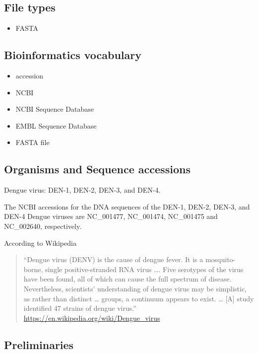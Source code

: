 \documentclass[
]{book}
\providecommand{\tightlist}{%
  \setlength{\itemsep}{0pt}\setlength{\parskip}{0pt}}
\begin{document}
\hypertarget{file-types}{%
\subsection{File types}\label{file-types}}

\begin{itemize}
\tightlist
\item
  FASTA
\end{itemize}

\hypertarget{bioinformatics-vocabulary}{%
\subsection{Bioinformatics vocabulary}\label{bioinformatics-vocabulary}}

\begin{itemize}
\tightlist
\item
  accession
\item
  NCBI
\item
  NCBI Sequence Database
\item
  EMBL Sequence Database
\item
  FASTA file
\end{itemize}

\hypertarget{organisms-and-sequence-accessions}{%
\subsection{Organisms and Sequence accessions}\label{organisms-and-sequence-accessions}}

Dengue virus: DEN-1, DEN-2, DEN-3, and DEN-4.

The NCBI accessions for the DNA sequences of the DEN-1, DEN-2, DEN-3, and DEN-4 Dengue viruses are NC\_001477, NC\_001474, NC\_001475 and NC\_002640, respectively.

According to Wikipedia

\begin{quote}
``Dengue virus (DENV) is the cause of dengue fever. It is a mosquito-borne, single positive-stranded RNA virus \ldots. Five serotypes of the virus have been found, all of which can cause the full spectrum of disease. Nevertheless, scientists' understanding of dengue virus may be simplistic, as rather than distinct \ldots{} groups, a continuum appears to exist. \ldots{} {[}A{]} study identified 47 strains of dengue virus.'' \url{https://en.wikipedia.org/wiki/Dengue_virus}
\end{quote}

\hypertarget{preliminaries-1}{%
\subsection{Preliminaries}\label{preliminaries-1}}
\end{document}
